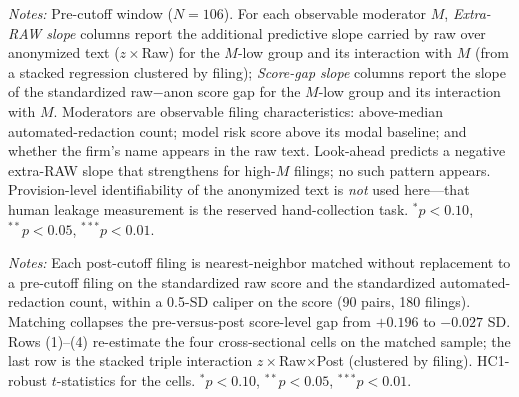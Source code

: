 \documentclass[12pt]{article}
\begin{document}
\begin{table}[htbp]\centering
\begin{threeparttable}
\caption{Heterogeneity of the raw-versus-anon gap by observable moderators (pre-cutoff)}
\label{tab:hetero}\small

\begin{tablenotes}\small\item \textit{Notes:} Pre-cutoff window ($N=106$). For each
observable moderator $M$, \emph{Extra-RAW slope} columns report the additional predictive
slope carried by raw over anonymized text ($z\times$Raw) for the $M$-low group and its
interaction with $M$ (from a stacked regression clustered by filing); \emph{Score-gap slope}
columns report the slope of the standardized raw$-$anon score gap for the $M$-low group and
its interaction with $M$. Moderators are observable filing characteristics: above-median
automated-redaction count; model risk score above its modal baseline; and whether the firm's
name appears in the raw text. Look-ahead predicts a negative extra-RAW slope that strengthens
for high-$M$ filings; no such pattern appears. Provision-level identifiability of the
anonymized text is \emph{not} used here---that human leakage measurement is the reserved
hand-collection task. $^{*}p<0.10$, $^{**}p<0.05$, $^{***}p<0.01$.
\end{tablenotes}
\end{threeparttable}
\end{table}

\begin{table}[htbp]\centering
\begin{threeparttable}
\caption{Composition-matched placebo (pre- and post-cutoff windows balanced on observables)}
\label{tab:matched}\small

\begin{tablenotes}\small\item \textit{Notes:} Each post-cutoff filing is nearest-neighbor
matched without replacement to a pre-cutoff filing on the standardized raw score and the
standardized automated-redaction count, within a 0.5-SD caliper on the score (90 pairs, 180
filings). Matching collapses the pre-versus-post score-level gap from $+0.196$ to $-0.027$ SD.
Rows (1)--(4) re-estimate the four cross-sectional cells on the matched sample; the last row
is the stacked triple interaction $z\times$Raw$\times$Post (clustered by filing). HC1-robust
$t$-statistics for the cells. $^{*}p<0.10$, $^{**}p<0.05$, $^{***}p<0.01$.
\end{tablenotes}
\end{threeparttable}
\end{table}
\end{document}

